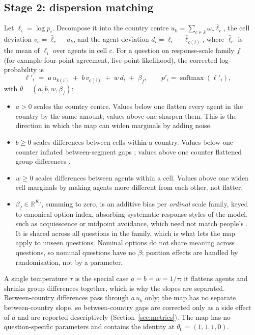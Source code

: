 \documentclass[11pt]{article}
\DeclareMathOperator{\softmax}{softmax}
\begin{document}
\subsection{Stage 2: dispersion matching}
Let $\ell_i=\log p_i$. Decompose it into the country centre $u_k=\sum_{c\in k}\omega_c\bar\ell_c$, the cell deviation $v_c=\bar\ell_c-u_k$, and the agent deviation $d_i=\ell_i-\bar\ell_{c(i)}$, where $\bar\ell_c$ is the mean of $\ell_i$ over agents in cell $c$. For a question on response-scale family $f$ (for example four-point agreement, five-point likelihood), the corrected log-probability is
\begin{equation}
\ell'_i \;=\; a\,u_{k(i)} \;+\; b\,v_{c(i)} \;+\; w\,d_i \;+\; \beta_f,
\qquad p'_i=\softmax(\ell'_i),
\label{eq:map}
\end{equation}
with $\theta=(a,b,w,\beta_f)$:
\begin{itemize}
  \item $a>0$ scales the country centre. Values below one flatten every agent in the country by the same amount; values above one sharpen them. This is the direction in which the map can widen marginals by adding noise.
  \item $b\ge0$ scales differences between cells within a country. Values below one counter inflated between-segment gaps \citep{chen2026synthetic}; values above one counter flattened group differences \citep{wang2024flatten}.
  \item $w\ge0$ scales differences between agents within a cell. Values above one widen cell marginals by making agents more different from each other, not flatter.
  \item $\beta_f\in\mathbb{R}^{K_f}$, summing to zero, is an additive bias per \emph{ordinal} scale family, keyed to canonical option index, absorbing systematic response styles of the model, such as acquiescence or midpoint avoidance, which need not match people's \citep{tjuatja2023response}. It is shared across all questions in the family, which is what lets the map apply to unseen questions. Nominal options do not share meaning across questions, so nominal questions have no $\beta$; position effects are handled by randomisation, not by a parameter.
\end{itemize}
A single temperature $\tau$ is the special case $a=b=w=1/\tau$: it flattens agents and shrinks group differences together, which is why the slopes are separated. Between-country differences pass through $a\,u_k$ only; the map has no separate between-country slope, so between-country gaps are corrected only as a side effect of $a$ and are reported descriptively (Section~\ref{sec:metrics}). The map has no question-specific parameters and contains the identity at $\theta_0=(1,1,1,0)$.
\end{document}
